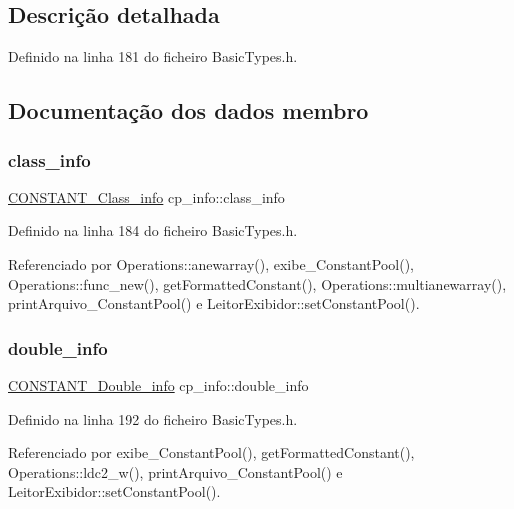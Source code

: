 \subsection{Descrição detalhada}


Definido na linha 181 do ficheiro Basic\+Types.\+h.



\subsection{Documentação dos dados membro}
\mbox{\label{structcp__info_add01ad1b269bc065f0863469cf8183b8}} 
\subsubsection{\texorpdfstring{class\+\_\+info}{class\_info}}
{\footnotesize\ttfamily \hyperlink{structCONSTANT__Class__info}{C\+O\+N\+S\+T\+A\+N\+T\+\_\+\+Class\+\_\+info} cp\+\_\+info\+::class\+\_\+info}



Definido na linha 184 do ficheiro Basic\+Types.\+h.



Referenciado por Operations\+::anewarray(), exibe\+\_\+\+Constant\+Pool(), Operations\+::func\+\_\+new(), get\+Formatted\+Constant(), Operations\+::multianewarray(), print\+Arquivo\+\_\+\+Constant\+Pool() e Leitor\+Exibidor\+::set\+Constant\+Pool().

\mbox{\label{structcp__info_aa76301d1853395d7594520988422c3d0}} 
\subsubsection{\texorpdfstring{double\+\_\+info}{double\_info}}
{\footnotesize\ttfamily \hyperlink{structCONSTANT__Double__info}{C\+O\+N\+S\+T\+A\+N\+T\+\_\+\+Double\+\_\+info} cp\+\_\+info\+::double\+\_\+info}



Definido na linha 192 do ficheiro Basic\+Types.\+h.



Referenciado por exibe\+\_\+\+Constant\+Pool(), get\+Formatted\+Constant(), Operations\+::ldc2\+\_\+w(), print\+Arquivo\+\_\+\+Constant\+Pool() e Leitor\+Exibidor\+::set\+Constant\+Pool().

